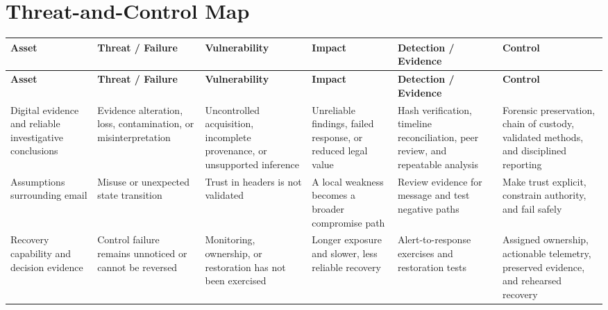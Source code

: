 \documentclass[11pt]{article}
\begin{document}
\section*{Threat-and-Control Map}
\begingroup\scriptsize\setlength{\tabcolsep}{2pt}
\begin{longtable}{>{\RaggedRight\arraybackslash}p{}>{\RaggedRight\arraybackslash}p{}>{\RaggedRight\arraybackslash}p{}>{\RaggedRight\arraybackslash}p{}>{\RaggedRight\arraybackslash}p{}>{\RaggedRight\arraybackslash}p{}}
\toprule\rowcolor{Navy}\color{white}\textbf{Asset} & \color{white}\textbf{Threat / Failure} & \color{white}\textbf{Vulnerability} & \color{white}\textbf{Impact} & \color{white}\textbf{Detection / Evidence} & \color{white}\textbf{Control}\\\midrule
\endfirsthead
\toprule\rowcolor{Navy}\color{white}\textbf{Asset} & \color{white}\textbf{Threat / Failure} & \color{white}\textbf{Vulnerability} & \color{white}\textbf{Impact} & \color{white}\textbf{Detection / Evidence} & \color{white}\textbf{Control}\\\midrule
\endhead
Digital evidence and reliable investigative conclusions & Evidence alteration, loss, contamination, or misinterpretation & Uncontrolled acquisition, incomplete provenance, or unsupported inference & Unreliable findings, failed response, or reduced legal value & Hash verification, timeline reconciliation, peer review, and repeatable analysis & Forensic preservation, chain of custody, validated methods, and disciplined reporting\\\midrule
Assumptions surrounding email & Misuse or unexpected state transition & Trust in headers is not validated & A local weakness becomes a broader compromise path & Review evidence for message and test negative paths & Make trust explicit, constrain authority, and fail safely\\\midrule
Recovery capability and decision evidence & Control failure remains unnoticed or cannot be reversed & Monitoring, ownership, or restoration has not been exercised & Longer exposure and slower, less reliable recovery & Alert-to-response exercises and restoration tests & Assigned ownership, actionable telemetry, preserved evidence, and rehearsed recovery\\\midrule
\bottomrule
\end{longtable}
\endgroup
\end{document}
